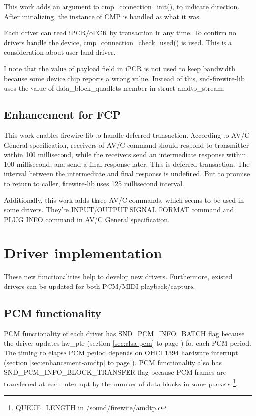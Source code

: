 \documentclass[onecolumn]{article}
\begin{document}
This work adds an argument to cmp\_connection\_init(), to indicate direction. After initializing, the instance of CMP is handled as what it was.

Each driver can read iPCR/oPCR by transaction in any time. To confirm no drivers handle the device, cmp\_connection\_check\_used() is used. This is a consideration about user-land driver.

I note that the value of payload field in iPCR is not used to keep bandwidth because some device chip reports a wrong value. Instead of this, snd-firewire-lib uses the value of data\_block\_quadlets member in struct amdtp\_stream.

\subsection{Enhancement for FCP}

This work enables firewire-lib to handle deferred transaction. According to AV/C General specification\cite{avc-general-4-2}, receivers of AV/C command should respond to transmitter within 100 millisecond, while the receivers send an intermediate response within 100 millisecond, and send a final response later. This is deferred transaction. The interval between the intermediate and final response is undefined. But to promise to return to caller, firewire-lib uses 125 millisecond interval.

Additionally, this work adds three AV/C commands, which seems to be used in some drivers. They're INPUT/OUTPUT SIGNAL FORMAT command and PLUG INFO command in AV/C General specification\cite{avc-general-4-2}.

\section{Driver implementation}

These new functionalities help to develop new drivers. Furthermore, existed drivers can be updated for both PCM/MIDI playback/capture.

\subsection{PCM functionality}

PCM functionality of each driver has SND\_PCM\_INFO\_BATCH flag because the driver updates hw\_ptr (section \ref{sec:alsa-pcm} to page \pageref{sec:alsa-pcm}) for each PCM period. The timing to elapse PCM period depends on OHCI 1394 hardware interrupt (section \ref{sec:enhancement-amdtp} to page \pageref{sec:enhancement-amdtp}). PCM functionality also has SND\_PCM\_INFO\_BLOCK\_TRANSFER flag because PCM frames are transferred at each interrupt by the number of data blocks in some packets \footnote{QUEUE\_LENGTH in /sound/firewire/amdtp.c}.
\end{document}
